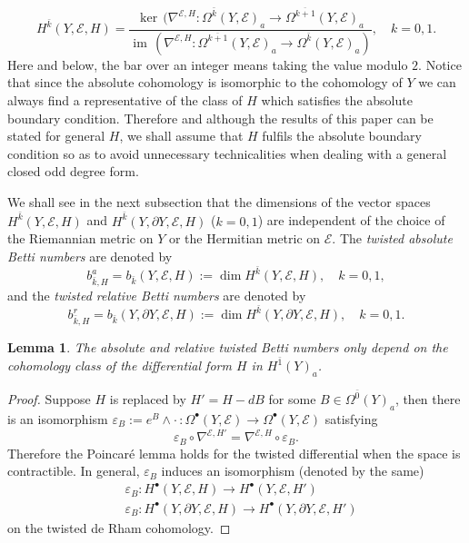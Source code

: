 \documentclass[12pt]{amsart}
\theoremstyle{plain}
\newtheorem{lemma}[theorem]{Lemma}
\theoremstyle{definition}
\theoremstyle{remark}
\begin{document}
$$
H^{\bar k}(Y, {\mathcal E},H)=
\frac{\ker\,(\nabla^{{\mathcal E},H}\colon\Omega^{\bar k}({{Y}},{\mathcal E})_a\to
 \Omega^{\overline{k+1}}({{Y}},{\mathcal E})_a}
{{\operatorname{im}}\,(\nabla^{{\mathcal E},H}\colon\Omega^{\overline{k+1}}({{Y}},{\mathcal E})_a\to
 \Omega^{\bar k}({{Y}},{\mathcal E})_a)},\quad k=0,1.
$$
Here and below, the bar over an integer means taking the value modulo $2$. {{Notice that since the absolute cohomology is isomorphic 
to the cohomology of $Y$
we can always find a representative of the class of $H$ which satisfies the absolute boundary condition. 
Therefore and although the results of this paper can be stated for general $H$, we shall assume that $H$ fulfils the absolute boundary condition  so as to avoid
unnecessary technicalities  when dealing with a general closed odd degree form. }}

{{We shall see in the next subsection that the dimensions of the vector spaces}} $H^{\bar k}(Y,{\mathcal E},H)$ and $H^{\bar k}(Y, \partial Y, {\mathcal E},H)$  ($k=0,1$) are independent of the
choice of the Riemannian metric on $Y$ or the Hermitian metric on ${\mathcal E}$. 
The {\em twisted absolute Betti numbers} are denoted by 
$$
b_{\bar k, {{H}}}^a =b_{\bar k}(Y,{\mathcal E},H):=\dim H^{\bar k}(Y,{\mathcal E},H),\quad k=0,1,
$$
and the {\em twisted relative Betti numbers} are denoted by 
$$
b_{\bar k, {{H}}}^r =b_{\bar k}(Y, \partial Y,{\mathcal E},H):=\dim H^{\bar k}(Y, \partial Y,{\mathcal E},H),\quad k=0,1.
$$

\begin{lemma}\label{lem:fluxindep}
The absolute and relative twisted Betti numbers only depend on the cohomology class of the differential form $H$ in $H^{\bar 1}(Y)_a$.
\end{lemma}

\begin{proof}
{{Suppose $H$ is replaced by $H'=H-dB$ for some $B\in\Omega^{\bar 0}(Y)_a$,
then there is an isomorphism $\varepsilon_B:=e^B\wedge\cdot\,\colon
\Omega^\bullet(Y,{\mathcal E})\to\Omega^\bullet(Y,{\mathcal E})$ satisfying}}
$$
\varepsilon_B\circ\nabla^{{\mathcal E},{{H'}}}=\nabla^{{\mathcal E},{{H}}}\circ\varepsilon_B.
$$
{{Therefore the Poincar\'e lemma holds for the twisted differential when the
space is contractible. 
In general, $\varepsilon_B$ induces an isomorphism (denoted by the same)
\begin{align*}\label{e^B}
& \varepsilon_B\colon H^\bullet(Y,{\mathcal E},H)\to H^\bullet(Y,{\mathcal E},H')\\
& \varepsilon_B\colon H^\bullet(Y, \partial Y, {\mathcal E},H)\to H^\bullet(Y,\partial Y,{\mathcal E},H')
\end{align*}
on the twisted de Rham cohomology.}}
\end{proof}
\end{document}
